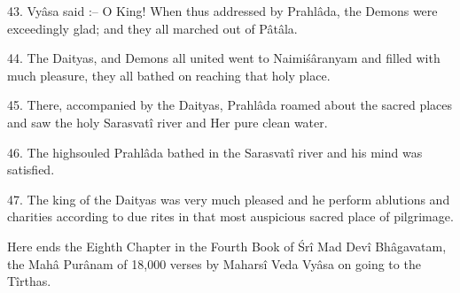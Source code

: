 43. Vy\^asa said :-- O King! When thus addressed by Prahl\^ada, the Demons were exceedingly glad; and they all marched out of P\^at\^ala.

44. The Daityas, and Demons all united went to Naimi\'s\^aranyam and filled with much pleasure, they all bathed on reaching that holy place.

45. There, accompanied by the Daityas, Prahl\^ada roamed about the sacred places and saw the holy Sarasvat\^i river and Her pure clean water.

46. The highsouled Prahl\^ada bathed in the Sarasvat\^i river and his mind was satisfied.

47. The king of the Daityas was very much pleased and he perform ablutions and charities according to due rites in that most auspicious sacred place of pilgrimage.

Here ends the Eighth Chapter in the Fourth Book of \'Sr\^i Mad Dev\^i Bh\^agavatam, the Mah\^a Pur\^anam of 18,000 verses by Mahars\^i Veda Vy\^asa on going to the T\^irthas.